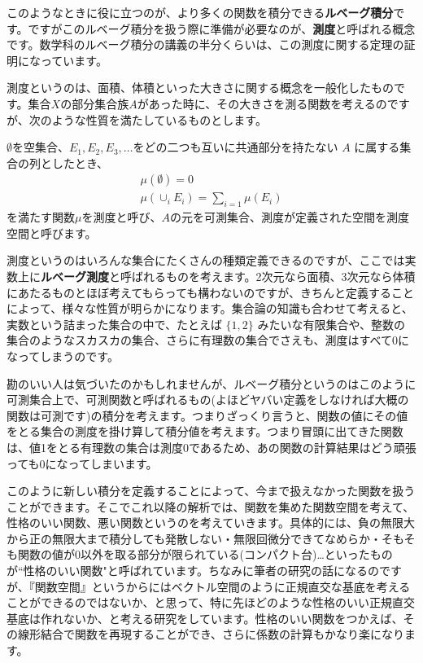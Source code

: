 このようなときに役に立つのが、より多くの関数を積分できる\textbf{ルベーグ積分}です。ですがこのルベーグ積分を扱う際に準備が必要なのが、\textbf{測度}と呼ばれる概念です。数学科のルベーグ積分の講義の半分くらいは、この測度に関する定理の証明になっています。

測度というのは、面積、体積といった大きさに関する概念を一般化したものです。集合$X$の部分集合族$A$があった時に、その大きさを測る関数を考えるのですが、次のような性質を満たしているものとします。

$\emptyset$を空集合、$E_1,E_2,E_3,\dotsc$をどの二つも互いに共通部分を持たない $A$ に属する集合の列としたとき、
\begin{gather*}
\mu (\emptyset) = 0 \\
\mu (\cup_i E_i) = \sum_{i=1} \mu (E_i)
\end{gather*}
を満たす関数$\mu$を測度と呼び、$A$の元を可測集合、測度が定義された空間を測度空間と呼びます。

測度というのはいろんな集合にたくさんの種類定義できるのですが、ここでは実数上に\textbf{ルベーグ測度}と呼ばれるものを考えます。2次元なら面積、3次元なら体積にあたるものとほぼ考えてもらっても構わないのですが、きちんと定義することによって、様々な性質が明らかになります。集合論の知識も合わせて考えると、実数という詰まった集合の中で、たとえば $\{1,2\}$ みたいな有限集合や、整数の集合のようなスカスカの集合、さらに有理数の集合でさえも、測度はすべて0になってしまうのです。

勘のいい人は気づいたのかもしれませんが、ルベーグ積分というのはこのように可測集合上で、可測関数と呼ばれるもの(よほどヤバい定義をしなければ大概の関数は可測です)の積分を考えます。つまりざっくり言うと、関数の値にその値をとる集合の測度を掛け算して積分値を考えます。つまり冒頭に出てきた関数は、値1をとる有理数の集合は測度0であるため、あの関数の計算結果はどう頑張っても0になってしまいます。

このように新しい積分を定義することによって、今まで扱えなかった関数を扱うことができます。そこでこれ以降の解析では、関数を集めた関数空間を考えて、性格のいい関数、悪い関数というのを考えていきます。具体的には、負の無限大から正の無限大まで積分しても発散しない・無限回微分できてなめらか・そもそも関数の値が0以外を取る部分が限られている(コンパクト台)…といったものが``性格のいい関数"と呼ばれています。ちなみに筆者の研究の話になるのですが、『関数空間』というからにはベクトル空間のように正規直交な基底を考えることができるのではないか、と思って、特に先ほどのような性格のいい正規直交基底は作れないか、と考える研究をしています。性格のいい関数をつかえば、その線形結合で関数を再現することができ、さらに係数の計算もかなり楽になります。

